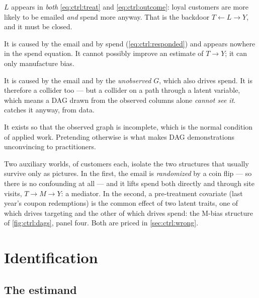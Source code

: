 \begin{description}[leftmargin=1.1em, style=nextline, font=\normalfont\itshape]
  \item[Loyalty is a confounder.] $L$ appears in \emph{both} \cref{eq:ctrl:treat} and
  \cref{eq:ctrl:outcome}: loyal customers are more likely to be emailed \emph{and} spend more
  anyway. That is the backdoor $T \leftarrow L \rightarrow Y$, and it must be closed.
  \item[\code{responded} is a collider.] It is caused by the email and by spend
  (\cref{eq:ctrl:responded}) and appears nowhere in the spend equation. It cannot possibly
  improve an estimate of $T \to Y$; it can only manufacture bias.
  \item[\code{opened\_email} is the subtler trap.] It is caused by the email and by the
  \emph{unobserved} $G$, which also drives spend. It is therefore a collider too --- but a
  collider on a path through a latent variable, which means a DAG drawn from the observed
  columns alone \emph{cannot see it}.  catches it anyway, from data.
  \item[$G$ is unobserved.] It exists so that the observed graph is incomplete, which is the
  normal condition of applied work. Pretending otherwise is what makes DAG demonstrations
  unconvincing to practitioners.
\end{description}

Two auxiliary worlds, of \nbFiveMiniN{} customers each, isolate the two structures that usually
survive only as pictures. In the first, the email is \emph{randomized} by a coin flip --- so
there is no confounding at all --- and it lifts spend both directly and through site visits,
$T \to M \to Y$: a mediator. In the second, a pre-treatment covariate (last year's coupon
redemptions) is the common effect of two latent traits, one of which drives targeting and the
other of which drives spend: the M-bias structure of \cref{fig:ctrl:dags}, panel four. Both are
priced in \cref{sec:ctrl:wrong}.



\section{Identification}
\label{sec:ctrl:ident}

\subsection*{The estimand}

